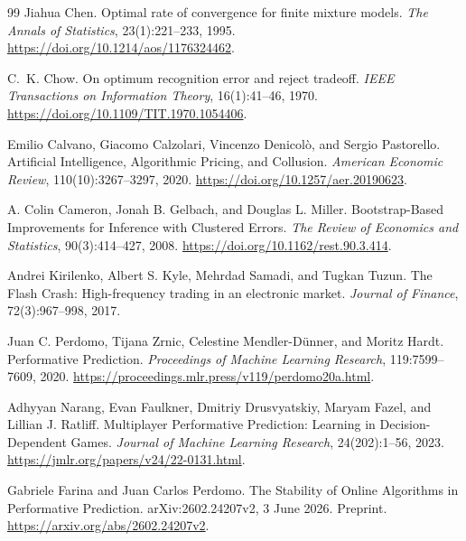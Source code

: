 \documentclass[10pt,twocolumn,letterpaper]{article}
\theoremstyle{definition}
\theoremstyle{remark}
\begin{document}
\begin{thebibliography}{99}
Jiahua Chen.
\newblock Optimal rate of convergence for finite mixture models.
\newblock \emph{The Annals of Statistics}, 23(1):221--233, 1995.
\newblock \url{https://doi.org/10.1214/aos/1176324462}.

C.~K. Chow.
\newblock On optimum recognition error and reject tradeoff.
\newblock \emph{IEEE Transactions on Information Theory}, 16(1):41--46, 1970.
\newblock \url{https://doi.org/10.1109/TIT.1970.1054406}.

Emilio Calvano, Giacomo Calzolari, Vincenzo Denicol\`o, and Sergio Pastorello.
\newblock Artificial Intelligence, Algorithmic Pricing, and Collusion.
\newblock \emph{American Economic Review}, 110(10):3267--3297, 2020.
\newblock \url{https://doi.org/10.1257/aer.20190623}.

A. Colin Cameron, Jonah B. Gelbach, and Douglas L. Miller.
\newblock Bootstrap-Based Improvements for Inference with Clustered Errors.
\newblock \emph{The Review of Economics and Statistics}, 90(3):414--427, 2008.
\newblock \url{https://doi.org/10.1162/rest.90.3.414}.

Andrei Kirilenko, Albert S. Kyle, Mehrdad Samadi, and Tugkan Tuzun.
\newblock The Flash Crash: High-frequency trading in an electronic market.
\newblock \emph{Journal of Finance}, 72(3):967--998, 2017.

Juan C. Perdomo, Tijana Zrnic, Celestine Mendler-D\"unner, and Moritz Hardt.
\newblock Performative Prediction.
\newblock \emph{Proceedings of Machine Learning Research}, 119:7599--7609, 2020.
\newblock \url{https://proceedings.mlr.press/v119/perdomo20a.html}.

Adhyyan Narang, Evan Faulkner, Dmitriy Drusvyatskiy, Maryam Fazel, and Lillian J. Ratliff.
\newblock Multiplayer Performative Prediction: Learning in Decision-Dependent Games.
\newblock \emph{Journal of Machine Learning Research}, 24(202):1--56, 2023.
\newblock \url{https://jmlr.org/papers/v24/22-0131.html}.

Gabriele Farina and Juan Carlos Perdomo.
\newblock The Stability of Online Algorithms in Performative Prediction.
\newblock arXiv:2602.24207v2, 3 June 2026. Preprint.
\newblock \url{https://arxiv.org/abs/2602.24207v2}.


\end{thebibliography}
\end{document}
